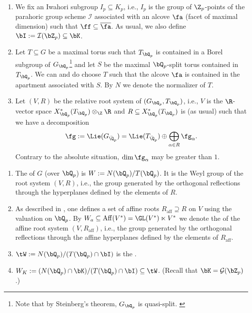 \documentclass[a4paper]{scrartcl} %
\numberwithin{equation}{section}
\begin{document}
\begin{Notation}\label{iwahori-notation}
  \begin{enumerate}[(1)]
  \item We fix an Iwahori subgroup $I_p\subseteq K_p$, i.e., $I_p$ is the group of $\Z_p$-points of the parahoric group scheme $\mathcal{I}$ associated with an alcove $\fa$ (facet of maximal dimension) such that $\ff\subseteq\overline{\fa}$. As usual, we also define $\bI:=\mathcal{I}(\bZ_p)\subseteq \bK$.
  \item Let $T\subseteq G$ be a maximal torus such that $T_{\bQ_p}$ is contained in a Borel subgroup of $G_{\bQ_p}$\footnote{Note that by Steinberg's theorem, $G_{\bQ_p}$ is quasi-split. \cite[Chap.~III, Â§\,2]{serre-galois}} and let $S$ be the maximal $\bQ_p$-split torus contained in $T_{\bQ_p}$. We can and do choose $T$ such that the alcove $\fa$ is contained in the apartment associated with $S$. By $N$ we denote the normalizer of $T$.
  \item Let $(V,R)$ be the relative root system of $(G_{\bQ_p},T_{\bQ_p})$, i.e., $V$ is the $\R$-vector space $X^*_{\bQ_p}(T_{\bQ_p})\otimes_\Z\R$ and $R\subseteq X^*_{\bQ_p}(T_{\bQ_p})$ is (as usual) such that we have a decomposition
    \begin{equation*}
      \fg:=\Lie(G_{\bar\Q_p})=\Lie(T_{\bar\Q_p})\oplus\bigoplus_{\alpha\in R}\fg_\alpha.
    \end{equation*}
    Contrary to the absolute situation, $\dim\fg_\alpha$ may be greater than $1$.
  \end{enumerate}
\end{Notation}

\begin{Definition}\label{weyl}
  \begin{enumerate}[(1)]
  \item \label{item:weyl-relweyl} The  of $G$ (over $\bQ_p$) is $W:=N(\bQ_p)/T(\bQ_p)$. It is the Weyl group of the root system $(V,R)$, i.e., the group generated by the orthogonal reflections through the hyperplanes defined by the elements of $R$.
  \item As described in \cite[.3]{landvogt}, one defines a set of affine roots $R_\mathrm{aff}\supseteq R$ on $V$ using the valuation on $\bQ_p$. By $W_a\subseteq\mathrm{Aff}(V^*)=\GL(V^*)\ltimes V^*$ we denote the  of the affine root system $(V,R_\mathrm{aff})$, i.e., the group generated by the orthogonal reflections through the affine hyperplanes defined by the elements of $R_\mathrm{aff}$.
  \item $\tW := N(\bQ_p)/(T(\bQ_p)\cap \bI)$ is the .
  \item $W_K:= (N(\bQ_p)\cap \bK)/(T(\bQ_p)\cap \bI)\subseteq\tW$. (Recall that $\bK=\mathcal{G}(\bZ_p)$.)
  \end{enumerate}
\end{Definition}
\end{document}
